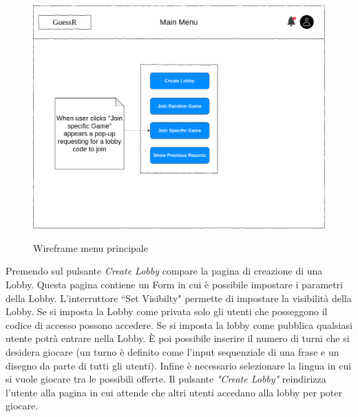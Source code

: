 \begin{figure}[H]
    \caption{Wireframe menu principale}
    \centering
    \includegraphics[width=\linewidth]{img/wireframes/main_menu.png}
    \label{fig:wireframe_main_menu}
\end{figure}

\noindent Premendo sul pulsante \textit{Create Lobby} compare la pagina di creazione di una Lobby. Questa pagina contiene un Form in cui è possibile impostare i parametri della Lobby. L'interruttore ``Set Visibilty" permette di impostare la visibilità della Lobby. Se si imposta la Lobby come privata solo gli utenti che posseggono il codice di accesso possono accedere. Se si imposta la lobby come pubblica qualsiasi utente potrà entrare nella Lobby.
È poi possibile inserire il numero di turni che si desidera giocare (un turno è definito come l'input sequenziale di una frase e un disegno da parte di tutti gli utenti). Infine è necessario selezionare la lingua in cui si vuole giocare tra le possibili offerte. Il pulsante \textit{"Create Lobby"} reindirizza l'utente alla pagina in cui attende che altri utenti accedano alla lobby per poter giocare.


